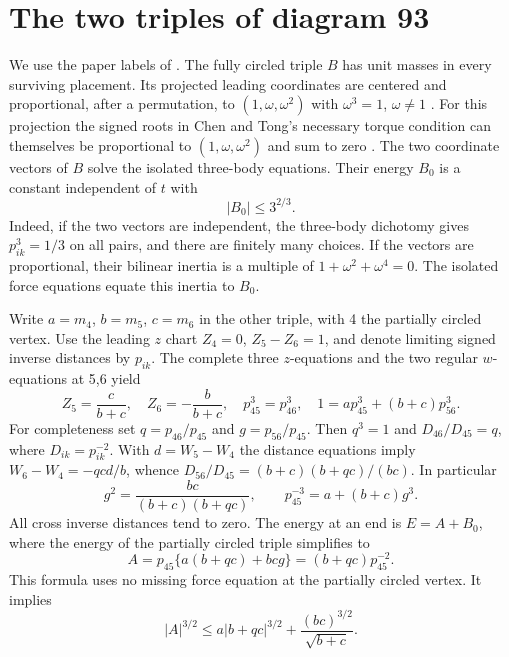 \documentclass[11pt]{article}
\begin{document}
\section{The two triples of diagram 93}
We use the paper labels of \cite[\S6.6]{Tomar}. The fully circled triple $B$ has unit masses in every surviving placement. Its projected leading coordinates are centered and proportional, after a permutation, to $(1,\omega,\omega^2)$ with $\omega^3=1$, $\omega\ne1$ \cite{PriorData}. For this projection the signed roots in Chen and Tong's necessary torque condition can themselves be proportional to $(1,\omega,\omega^2)$ and sum to zero \cite[Prop.~5.16, eq.~(109)]{CT}. The two coordinate vectors of $B$ solve the isolated three-body equations. Their energy $B_0$ is a constant independent of $t$ with
\begin{equation}\label{boundB}
 |B_0|\le 3^{2/3}.
\end{equation}
Indeed, if the two vectors are independent, the three-body dichotomy \cite[Lemma 6.9]{Tomar} gives $p_{ik}^3=1/3$ on all pairs, and there are finitely many choices. If the vectors are proportional, their bilinear inertia is a multiple of $1+\omega^2+\omega^4=0$. The isolated force equations equate this inertia to $B_0$.

Write $a=m_4$, $b=m_5$, $c=m_6$ in the other triple, with 4 the partially circled vertex. Use the leading $z$ chart $Z_4=0$, $Z_5-Z_6=1$, and denote limiting signed inverse distances by $p_{ik}$. The complete three $z$-equations and the two regular $w$-equations at 5,6 yield \cite{PriorData}
\[
 Z_5=\frac{c}{b+c},\quad Z_6=-\frac{b}{b+c},\quad p_{45}^3=p_{46}^3,\quad
 1=a p_{45}^3+(b+c)p_{56}^3 .
\]
For completeness set $q=p_{46}/p_{45}$ and $g=p_{56}/p_{45}$. Then $q^3=1$ and $D_{46}/D_{45}=q$, where $D_{ik}=p_{ik}^{-2}$. With $d=W_5-W_4$ the distance equations imply $W_6-W_4=-qc d/b$, whence $D_{56}/D_{45}=(b+c)(b+qc)/(bc)$. In particular
\begin{equation}\label{g}
 g^2=\frac{bc}{(b+c)(b+qc)},\qquad
 p_{45}^{-3}=a+(b+c)g^3 .
\end{equation}
All cross inverse distances tend to zero. The energy at an end is $E=A+B_0$, where the energy of the partially circled triple simplifies to
\begin{equation}\label{A}
 A=p_{45}\{a(b+qc)+bcg\}=(b+qc)p_{45}^{-2}.
\end{equation}
This formula uses no missing force equation at the partially circled vertex. It implies
\begin{equation}\label{boundA}
 |A|^{3/2}\le a|b+qc|^{3/2}+\frac{(bc)^{3/2}}{\sqrt{b+c}}.
\end{equation}
\end{document}
